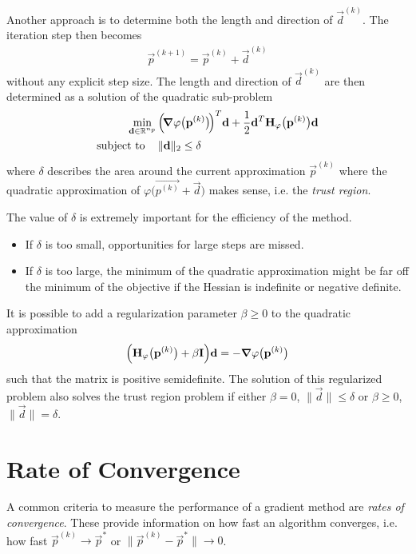 		Another approach is to determine both the length and direction of \( \vec{d}^{(k)} \). The iteration step then becomes
		\begin{align*}
			\vec{p}^{(k + 1)} = \vec{p}^{(k)} + \vec{d}^{(k)}
		\end{align*}
		without any explicit step size. The length and direction of \( \vec{d}^{(k)} \) are then determined as a solution of the quadratic sub-problem
		\begin{align*}
			\min_{\boldsymbol{\mathrm{d}} \in \mathbb{R}^{n_p}} &\, \Big(\! \grad{\varphi}\big(\boldsymbol{\mathrm{p}}^{(k)}\big) \!\Big)^T \boldsymbol{\mathrm{d}} + \frac{1}{2} \boldsymbol{\mathrm{d}}^T \boldsymbol{\mathrm{H}}_\varphi\big(\boldsymbol{\mathrm{p}}^{(k)}\big) \boldsymbol{\mathrm{d}} \\
			\mathrm{subject~to}\quad &\,
				\begin{alignedat}[t]{2}
					\lVert \boldsymbol{\mathrm{d}} \rVert_2 & \leq \delta
				\end{alignedat}
		\end{align*}
		where \(\delta\) describes the area around the current approximation \( \vec{p}^{(k)} \) where the quadratic approximation of \( \varphi\big(\vec{p^{(k)}} + \vec{d}\big) \) makes sense, i.e. the \emph{trust region}.
		
		The value of \(\delta\) is extremely important for the efficiency of the method.
		\begin{itemize}
			\item If \(\delta\) is too small, opportunities for large steps are missed.
			\item If \(\delta\) is too large, the minimum of the quadratic approximation might be far off the minimum of the objective if the Hessian is indefinite or negative definite.
		\end{itemize}
		It is possible to add a regularization parameter \(\beta \geq 0\) to the quadratic approximation
		\begin{align*}
			\Big( \boldsymbol{\mathrm{H}}_\varphi\big(\boldsymbol{\mathrm{p}}^{(k)}\big) + \beta \boldsymbol{\mathrm{I}} \Big) \boldsymbol{\mathrm{d}} = -\grad{\varphi}\big(\boldsymbol{\mathrm{p}}^{(k)}\big)
		\end{align*}
		such that the matrix is positive semidefinite. The solution of this regularized problem also solves the trust region problem if either \( \beta = 0 \), \( \lVert \vec{d} \rVert \leq \delta \) or \( \beta \geq 0 \), \( \lVert \vec{d} \rVert = \delta \).

	\section{Rate of Convergence}
		A common criteria to measure the performance of a gradient method are \emph{rates of convergence}. These provide information on how fast an algorithm converges, i.e. how fast \( \vec{p}^{(k)} \to \vec{p}^\ast \) or \( \big\lVert \vec{p}^{(k)} - \vec{p}^\ast \big\rVert \to 0 \).
		
